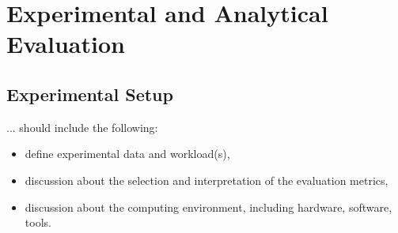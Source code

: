 \chapter{Experimental and Analytical Evaluation\label{cha:chapter4}}

\section{Experimental Setup\label{sec:exp}}
... should include the following:
\begin{itemize}

\item define experimental data and workload(s),
\item discussion about the selection and interpretation of the evaluation metrics,
\item discussion about the computing environment, including hardware, software, tools.
\end{itemize}

\begingroup
\renewcommand\thesection{5.X}


